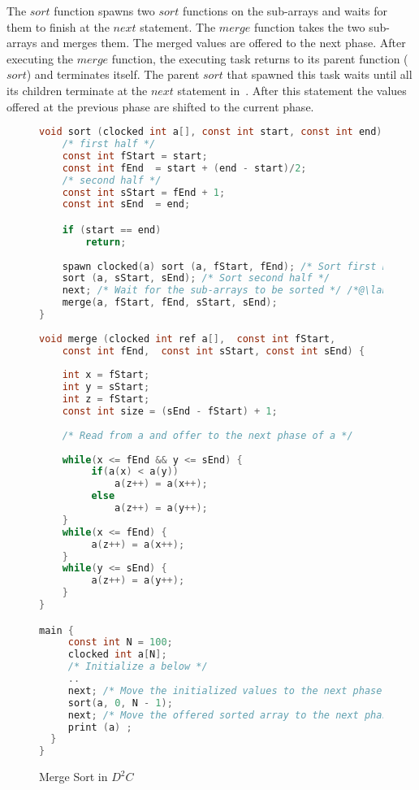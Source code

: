 \documentclass[10pt, conference, compsocconf]{IEEEtran}
\begin{document}
The $sort$ function spawns two $sort$ functions on the sub-arrays
and waits for them to finish at the $next$ statement.
The $merge$ function takes the two sub-arrays and merges them.
The merged values are offered to the next phase. 
After executing  the $merge$ function, the executing task
 returns to its parent function ($sort$) and terminates
itself.  The parent $sort$ that spawned this task waits until all its children
terminate at the $next$ statement in~. After this statement
the values offered at the previous phase are shifted to the current phase.




\begin{figure}[htbp]
\begin{lstlisting}[language=C]
void sort (clocked int a[], const int start, const int end)  {
    /* first half */
    const int fStart = start;
    const int fEnd  = start + (end - start)/2;
    /* second half */
    const int sStart = fEnd + 1;
    const int sEnd  = end;

    if (start == end)
        return;
        	
    spawn clocked(a) sort (a, fStart, fEnd); /* Sort first half */ 
    sort (a, sStart, sEnd); /* Sort second half */ 
    next; /* Wait for the sub-arrays to be sorted */ /*@\label{line:next1}@*/;
    merge(a, fStart, fEnd, sStart, sEnd);
}
    
void merge (clocked int ref a[],  const int fStart, 
    const int fEnd,  const int sStart, const int sEnd) {
    	
    int x = fStart;
    int y = sStart;
    int z = fStart;
    const int size = (sEnd - fStart) + 1;
  
    /* Read from a and offer to the next phase of a */   
 
    while(x <= fEnd && y <= sEnd) {
         if(a(x) < a(y))
             a(z++) = a(x++);
         else
             a(z++) = a(y++);
    }
    while(x <= fEnd) {
         a(z++) = a(x++);
    }
    while(y <= sEnd) {
         a(z++) = a(y++);
    }
}

main {
     const int N = 100;
     clocked int a[N]; 
     /* Initialize a below */
     ..
     next; /* Move the initialized values to the next phase */ 
     sort(a, 0, N - 1);
     next; /* Move the offered sorted array to the next phase */
     print (a) ; 
  }
}
\end{lstlisting}
\caption{Merge Sort in $D^2C$}
\label{fig:mergesort}
\end{figure}
\end{document}
